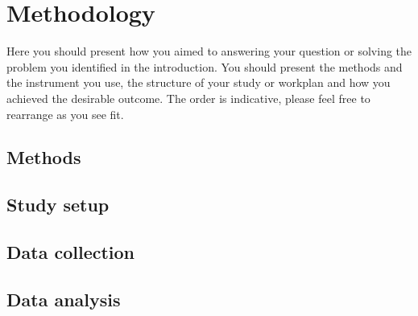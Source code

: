 \chapter{Methodology}
\label{sec:Methodology}

Here you should present how you aimed to answering your question or solving the problem you identified in the introduction.
You should present the methods and the instrument you use, the structure of your study or workplan and how you achieved the desirable outcome. The order is indicative, please feel free to rearrange as you see fit.

\section {Methods}

\section{Study setup}

\section{Data collection}


\section{Data analysis}

